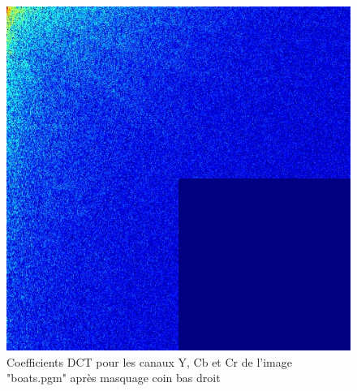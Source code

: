 \documentclass[12pt]{report}
\begin{document}
\begin{figure}[H]
\begin{center}
\includegraphics[scale=0.25]{../ImageRes/dct_masked0_2.jpg} 
\caption{Coefficients DCT pour les canaux Y, Cb et Cr de l'image "boats.pgm" après masquage coin bas droit}
\end{center}
\end{figure}
\end{document}
